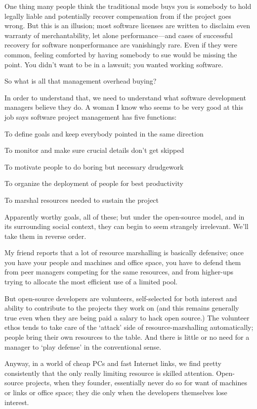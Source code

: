 \documentclass[a4paper,12pt,UTF8,twoside]{ctexbook}
\begin{document}
One thing many people think the traditional mode buys you is somebody to hold legally liable and potentially recover compensation from if the project goes wrong. But this is an illusion; most software licenses are written to disclaim even warranty of merchantability, let alone performance—and cases of successful recovery for software nonperformance are vanishingly rare. Even if they were common, feeling comforted by having somebody to sue would be missing the point. You didn't want to be in a lawsuit; you wanted working software.

So what is all that management overhead buying?

In order to understand that, we need to understand what software development managers believe they do. A woman I know who seems to be very good at this job says software project management has five functions:

To define goals and keep everybody pointed in the same direction

To monitor and make sure crucial details don't get skipped

To motivate people to do boring but necessary drudgework

To organize the deployment of people for best productivity

To marshal resources needed to sustain the project

Apparently worthy goals, all of these; but under the open-source model, and in its surrounding social context, they can begin to seem strangely irrelevant. We'll take them in reverse order.

My friend reports that a lot of resource marshalling is basically defensive; once you have your people and machines and office space, you have to defend them from peer managers competing for the same resources, and from higher-ups trying to allocate the most efficient use of a limited pool.

But open-source developers are volunteers, self-selected for both interest and ability to contribute to the projects they work on (and this remains generally true even when they are being paid a salary to hack open source.) The volunteer ethos tends to take care of the `attack' side of resource-marshalling automatically; people bring their own resources to the table. And there is little or no need for a manager to `play defense' in the conventional sense.

Anyway, in a world of cheap PCs and fast Internet links, we find pretty consistently that the only really limiting resource is skilled attention. Open-source projects, when they founder, essentially never do so for want of machines or links or office space; they die only when the developers themselves lose interest.
\end{document}
